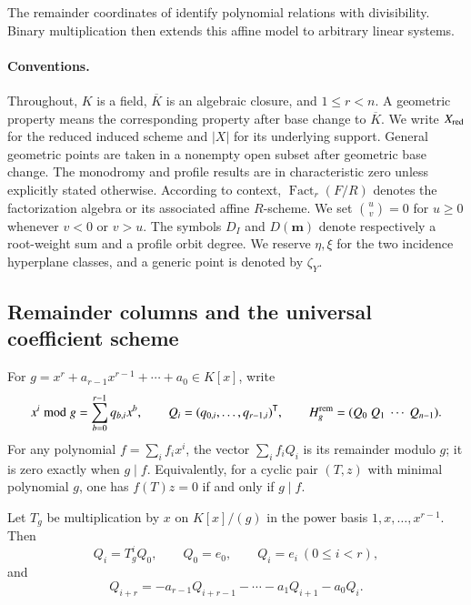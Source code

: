 \documentclass[10pt,fleqn]{article}
\numberwithin{equation}{section}
\newcommand{\Fact}{\operatorname{Fact}}
\begin{document}
The remainder coordinates of \cite{LiYuanOrbits,LiYuanSchur} identify
polynomial relations with divisibility.  Binary multiplication then
extends this affine model to arbitrary linear systems.

\paragraph{Conventions.}
Throughout, $K$ is a field, $\overline K$ is an algebraic closure, and $1\le r<n$.
A geometric property means the corresponding property after base change to $\overline K$.
We write $X_{\rm red}$ for the reduced induced scheme and $|X|$ for its underlying
support.  General geometric points are taken in a nonempty open subset after geometric
base change.  The monodromy and profile results are in characteristic zero unless
explicitly stated otherwise.
According to context, $\Fact_r(F/R)$ denotes the factorization algebra or its associated
affine $R$-scheme.
We set $\binom uv=0$ for $u\ge0$ whenever $v<0$ or $v>u$.
The symbols $D_I$ and $D(\boldsymbol m)$ denote respectively a root-weight
sum and a profile orbit degree.  We reserve $\eta,\xi$ for the two incidence hyperplane classes, and a
generic point is denoted by $\zeta_Y$.

\subsection{Remainder columns and the universal coefficient scheme}

For $g=x^r+a_{r-1}x^{r-1}+\cdots+a_0\in K[x]$, write
\begin{equation}\label{eq:intro-H}
 x^i\bmod g=\sum_{b=0}^{r-1}q_{b,i}x^b,\qquad
 Q_i=(q_{0,i},\ldots,q_{r-1,i})^{\mathsf T},\qquad
 H_g^{\rm rem}=(Q_0\ Q_1\ \cdots\ Q_{n-1}).
\end{equation}
For any polynomial $f=\sum_i f_ix^i$, the vector $\sum_i f_iQ_i$ is its remainder
modulo $g$; it is zero exactly when $g\mid f$.  Equivalently, for a cyclic pair
$(T,z)$ with minimal polynomial $g$, one has $f(T)z=0$ if and only if $g\mid f$.


Let $T_g$ be multiplication by $x$ on $K[x]/(g)$ in the power basis
$1,x,\ldots,x^{r-1}$.  Then
\begin{equation}\label{eq:remainder-recurrence}
 Q_i=T_g^iQ_0,\qquad Q_0=e_0,\qquad Q_i=e_i\ (0\le i<r),
\end{equation}
and
\begin{equation}\label{eq:Q-recurrence}
 Q_{i+r}=-a_{r-1}Q_{i+r-1}-\cdots-a_1Q_{i+1}-a_0Q_i.
\end{equation}
\end{document}

